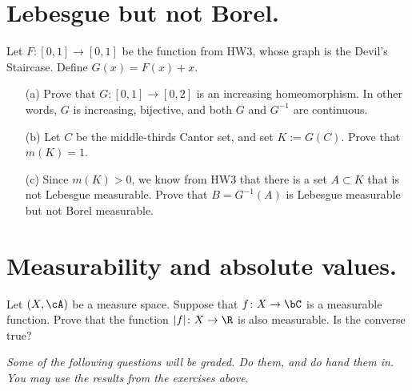 \documentclass[lang=cn,11pt]{elegantbook}
\begin{document}
\section{Lebesgue but not Borel.}
  Let $F\colon[0,1]\to[0,1]$ be the function from HW3, whose graph is the Devil's Staircase. Define $G(x)=F(x)+x$. 
  \begin{itemize}
  \item[(a)]
    Prove that $G:[0,1]\to [0,2]$ is an increasing homeomorphism. In other words, $G$ is increasing, bijective, and both $G$ and $G^{-1}$ are continuous. 
  \item[(b)]
    Let $C$ be the middle-thirds Cantor set, and set $K:=G(C)$. Prove that $m(K)=1$. 
  \item[(c)]
    Since $m(K)>0$, we know from HW3 that there is a set $A\subset K$ that is not 
    Lebesgue measurable. Prove that $B=G^{-1}(A)$ is Lebesgue measurable but not 
    Borel measurable. 
  \end{itemize}

\section{Measurability and absolute values.}
  Let $(X,\cA)$ be a measure space. 
  Suppose that $f\colon X\to\bC$ is a measurable function. Prove that the function $|f|\colon X\to\R$ is also measurable. Is the converse true? 



  
\begin{center}
\textit{Some of the following questions will be graded. Do them, and do hand them in. You may use the results from the exercises above}.
\end{center}
\end{document}
